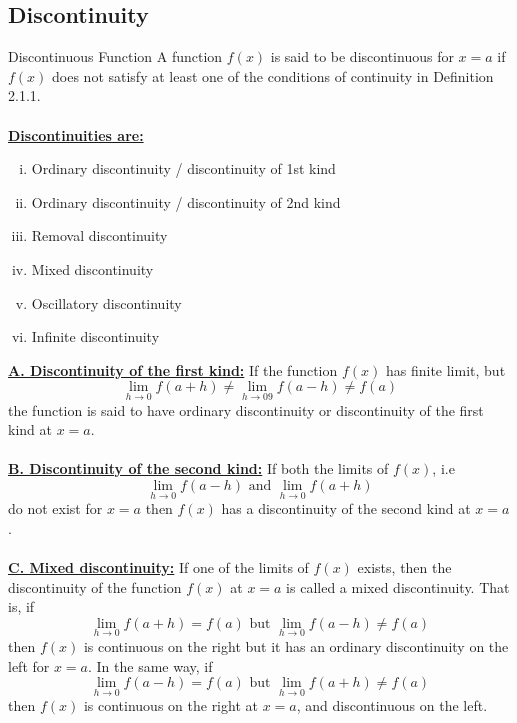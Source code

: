 
\subsection{Discontinuity}

\begin{definition}{Discontinuous Function}
    A function $f(x)$ is said to be discontinuous for $x=a$ if $f(x)$ does not satisfy at least one of the conditions of continuity in Definition 2.1.1. \\~\\

    \underline{\textbf{Discontinuities are:}}
    \begin{enumerate}[(i)]
        \item Ordinary discontinuity / discontinuity of 1st kind
        \item Ordinary discontinuity / discontinuity of 2nd kind
        \item Removal discontinuity
        \item Mixed discontinuity
        \item Oscillatory discontinuity
        \item Infinite discontinuity
    \end{enumerate}
\end{definition}\vspace{5mm}

\underline{\textbf{A. Discontinuity of the first kind:}}
If the function $f(x)$ has finite limit, but  \[
    \lim_{h \to 0} f(a+h) \neq \lim_{h \to 09} f(a-h) \neq f(a)
\] the function is said to have ordinary discontinuity or discontinuity of the first kind at $x=a$. \\~\\

\underline{\textbf{B. Discontinuity of the second kind:}}
If both the limits of $f(x)$, i.e \[
    \lim_{h \to 0} f(a-h) \text{ and } \lim_{h \to 0} f(a+h)
\] do not exist for $x=a$ then $f(x)$ has a discontinuity of the second kind at $x=a$. \\~\\

\underline{\textbf{C. Mixed discontinuity:}}
If one of the limits of $f(x)$ exists, then the discontinuity of the function $f(x)$ at $x=a$ is called a mixed discontinuity. That is, if \[
    \lim_{h \to 0} f(a+h) = f(a) \text{ but } \lim_{h \to 0} f(a-h) \neq f(a)
\] then $f(x)$ is continuous on the right but it has an ordinary discontinuity on the left for $x=a$. In the same way, if \[
     \lim_{h \to 0} f(a-h) = f(a) \text{ but } \lim_{h \to 0} f(a+h) \neq  f(a)
\] then $f(x)$ is continuous on the right at $x=a$, and discontinuous on the left. \\~\\

